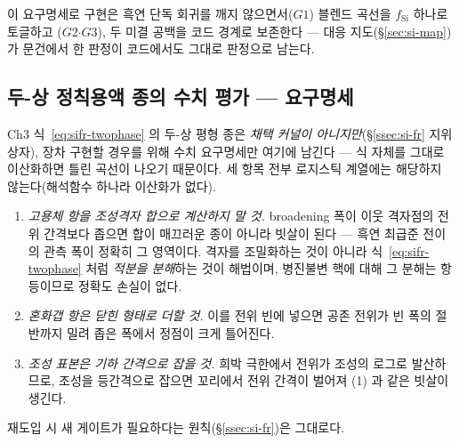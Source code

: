 이 요구명세로 구현은 흑연 단독 회귀를 깨지 않으면서($G1$) 블렌드 곡선을 $f_\mathrm{Si}$ 하나로 토글하고
($G2$$\cdot$$G3$), 두 미결 공백을 코드 경계로 보존한다 --- 대응 지도(\S\ref{sec:si-map})가 문건에서
한 판정이 코드에서도 그대로 판정으로 남는다.

\subsection{두-상 정칙용액 종의 수치 평가 --- 요구명세}\label{ssec:code-twophase}
Ch3 식~\eqref{eq:sifr-twophase} 의 두-상 평형 종은 \emph{채택 커널이 아니지만}(\S\ref{ssec:si-fr} 지위 상자),
장차 구현할 경우를 위해 수치 요구명세만 여기에 남긴다 --- 식 자체를 그대로 이산화하면 틀린 곡선이 나오기
때문이다. 세 항목 전부 로지스틱 계열에는 해당하지 않는다(해석함수 하나라 이산화가 없다).
\begin{enumerate}[label=(\arabic*),leftmargin=2.0em,itemsep=3pt]
\item \emph{고용체 항을 조성격자 합으로 계산하지 말 것.} broadening 폭이 이웃 격자점의 전위 간격보다
좁으면 합이 매끄러운 종이 아니라 빗살이 된다 --- 흑연 최급준 전이의 관측 폭이 정확히 그 영역이다.
격자를 조밀화하는 것이 아니라 식~\eqref{eq:sifr-twophase} 처럼 \emph{적분을 분해}하는 것이 해법이며,
병진불변 핵에 대해 그 분해는 항등이므로 정확도 손실이 없다.
\item \emph{혼화갭 항은 닫힌 형태로 더할 것.} 이를 전위 빈에 넣으면 공존 전위가 빈 폭의 절반까지 밀려
좁은 폭에서 정점이 크게 틀어진다.
\item \emph{조성 표본은 기하 간격으로 잡을 것.} 희박 극한에서 전위가 조성의 로그로 발산하므로, 조성을
등간격으로 잡으면 꼬리에서 전위 간격이 벌어져 (1) 과 같은 빗살이 생긴다.
\end{enumerate}
재도입 시 새 게이트가 필요하다는 원칙(\S\ref{ssec:si-fr})은 그대로다.

